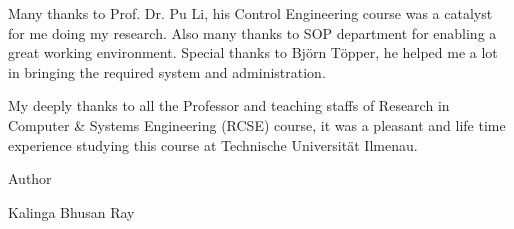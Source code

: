 \vspace{1em}
\noindent Many thanks to Prof. Dr. Pu Li, his Control Engineering course was a 
catalyst for me doing my research. Also many thanks to SOP department for 
enabling a great working environment. Special thanks to Bj{\"o}rn T{\"o}pper, 
he helped me a lot in bringing the required system and administration.

\vspace{1em}
\noindent My deeply thanks to all the Professor and teaching staffs of Research 
in Computer \& Systems Engineering (RCSE) course, it was a pleasant and life 
time experience studying this course at Technische Universit{\"a}t Ilmenau.

\vspace{1em}
\noindent Author

\vspace{1em}
\noindent Kalinga Bhusan Ray


